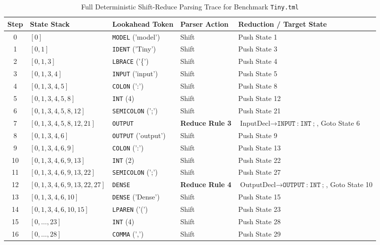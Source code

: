 \documentclass[11pt,a4paper]{article}
\begin{document}
\begin{table}[htbp]
\centering
\scriptsize
\caption{Full Deterministic Shift-Reduce Parsing Trace for Benchmark \texttt{Tiny.tml}}
\label{tab:parse_trace_tiny}
\begin{tabular}{cllll}
\toprule
\textbf{Step} & \textbf{State Stack} & \textbf{Lookahead Token} & \textbf{Parser Action} & \textbf{Reduction / Target State} \\
\midrule
0  & $[0]$ & \texttt{MODEL} ('model') & Shift & Push State 1 \\
1  & $[0, 1]$ & \texttt{IDENT} ('Tiny') & Shift & Push State 3 \\
2  & $[0, 1, 3]$ & \texttt{LBRACE} ('\{') & Shift & Push State 4 \\
3  & $[0, 1, 3, 4]$ & \texttt{INPUT} ('input') & Shift & Push State 5 \\
4  & $[0, 1, 3, 4, 5]$ & \texttt{COLON} (':') & Shift & Push State 8 \\
5  & $[0, 1, 3, 4, 5, 8]$ & \texttt{INT} (4) & Shift & Push State 12 \\
6  & $[0, 1, 3, 4, 5, 8, 12]$ & \texttt{SEMICOLON} (';') & Shift & Push State 21 \\
7  & $[0, 1, 3, 4, 5, 8, 12, 21]$ & \texttt{OUTPUT} & \textbf{Reduce Rule 3} & $\text{InputDecl} \rightarrow \texttt{INPUT} \ \texttt{:} \ \texttt{INT} \ \texttt{;}$, Goto State 6 \\
8  & $[0, 1, 3, 4, 6]$ & \texttt{OUTPUT} ('output') & Shift & Push State 9 \\
9  & $[0, 1, 3, 4, 6, 9]$ & \texttt{COLON} (':') & Shift & Push State 13 \\
10 & $[0, 1, 3, 4, 6, 9, 13]$ & \texttt{INT} (2) & Shift & Push State 22 \\
11 & $[0, 1, 3, 4, 6, 9, 13, 22]$ & \texttt{SEMICOLON} (';') & Shift & Push State 27 \\
12 & $[0, 1, 3, 4, 6, 9, 13, 22, 27]$ & \texttt{DENSE} & \textbf{Reduce Rule 4} & $\text{OutputDecl} \rightarrow \texttt{OUTPUT} \ \texttt{:} \ \texttt{INT} \ \texttt{;}$, Goto State 10 \\
13 & $[0, 1, 3, 4, 6, 10]$ & \texttt{DENSE} ('Dense') & Shift & Push State 15 \\
14 & $[0, 1, 3, 4, 6, 10, 15]$ & \texttt{LPAREN} ('(') & Shift & Push State 23 \\
15 & $[0, \dots, 23]$ & \texttt{INT} (4) & Shift & Push State 28 \\
16 & $[0, \dots, 28]$ & \texttt{COMMA} (',') & Shift & Push State 29 \\

\end{tabular}
\end{table}
\end{document}
